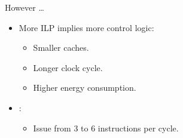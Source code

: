 \begin{frame}[t]{However \ldots}
\begin{itemize}
  \item More ILP implies more control logic:
    \begin{itemize}
      \item Smaller caches.
      \item Longer clock cycle.
      \item Higher energy consumption.
    \end{itemize}

  \item {}:
    \begin{itemize}
      \item Issue from 3 to 6 instructions per cycle.
    \end{itemize}
\end{itemize}
\end{frame}
